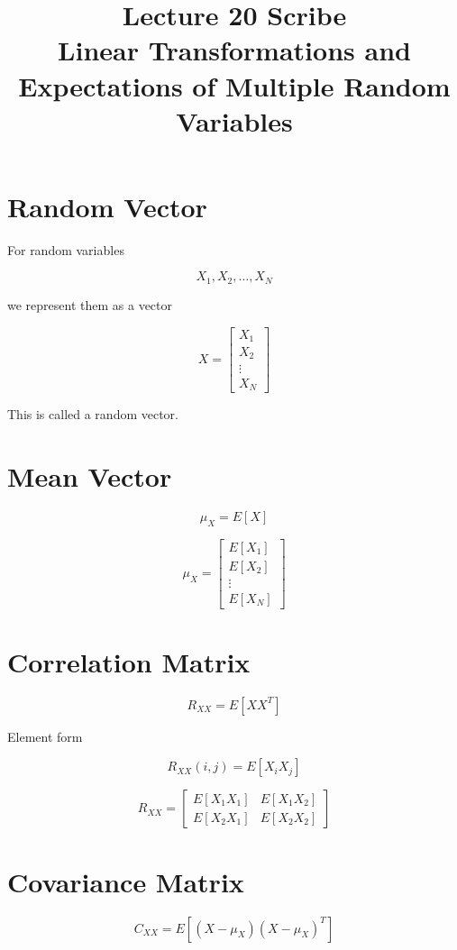 \documentclass[12pt]{article}
\title{Lecture 20 Scribe \\ Linear Transformations and Expectations of Multiple Random Variables}
\author{}
\date{}
\begin{document}
\maketitle

\section{Random Vector}

For random variables

\[
X_1, X_2, \dots, X_N
\]

we represent them as a vector

\[
X =
\begin{bmatrix}
X_1 \\
X_2 \\
\vdots \\
X_N
\end{bmatrix}
\]

This is called a random vector.

\section{Mean Vector}

\[
\mu_X = E[X]
\]

\[
\mu_X =
\begin{bmatrix}
E[X_1] \\
E[X_2] \\
\vdots \\
E[X_N]
\end{bmatrix}
\]

\section{Correlation Matrix}

\[
R_{XX} = E[XX^T]
\]

Element form

\[
R_{XX}(i,j) = E[X_i X_j]
\]

\[
R_{XX} =
\begin{bmatrix}
E[X_1X_1] & E[X_1X_2] \\
E[X_2X_1] & E[X_2X_2]
\end{bmatrix}
\]

\section{Covariance Matrix}

\[
C_{XX} =
E[(X-\mu_X)(X-\mu_X)^T]
\]
\end{document}
